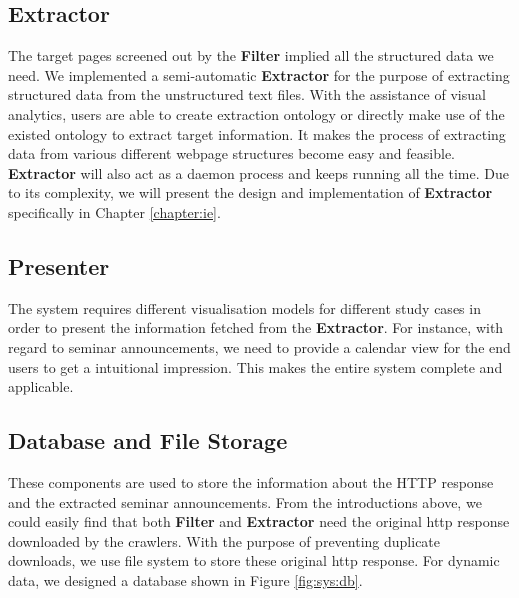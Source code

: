 \subsection{Extractor}
The target pages screened out by the \textbf{Filter} implied all the structured data we need. We implemented a semi-automatic \textbf{Extractor} for the purpose of extracting structured data from the unstructured text files. With the assistance of visual analytics, users are able to create extraction ontology or directly make use of the existed ontology to extract target information. It makes the process of extracting data from various different webpage structures become easy and feasible. \textbf{Extractor} will also act as a daemon process and keeps running all the time. Due to its complexity, we will present the design and implementation of \textbf{Extractor} specifically in Chapter \ref{chapter:ie}.

\subsection{Presenter}
The system requires different visualisation models for different study cases in order to present the information fetched from the \textbf{Extractor}. For instance, with regard to seminar announcements, we need to provide a calendar view for the end users to get a intuitional impression. This makes the entire system complete and applicable. 

\subsection{Database and File Storage}
These components are used to store the information about the HTTP response and the extracted seminar announcements. From the introductions above, we could easily find that both \textbf{Filter} and \textbf{Extractor} need the original http response downloaded by the crawlers. With the purpose of preventing duplicate downloads, we use file system to store these original http response. For dynamic data, we designed a database shown in Figure \ref{fig:sys:db}.

